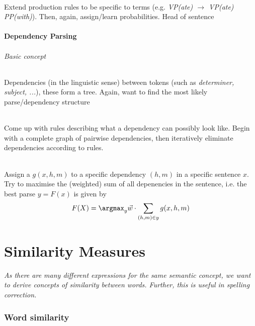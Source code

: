 \documentclass[10pt,twocolumn]{article}
\begin{document}
\paragraph{} Extend production rules to be specific to
terms (e.g. \textit{VP(ate)  $\rightarrow$ VP(ate) PP(with)}). Then, again,
assign/learn probabilities. \todo Head of sentence

\subsection{Dependency Parsing}

\paragraph{\textit{Basic concept}} Dependencies (in the linguistic sense)
between tokens (such as \textit{determiner, subject, ...}), these form a tree.
Again, want to find the most likely parse/dependency structure

\paragraph{ } Come up with rules describing what a
dependency can possibly look like. Begin with a complete graph of pairwise
dependencies, then iteratively eliminate dependencies according to rules.

\paragraph{ } Assign a 
$g(x,h,m)$ to a specific dependency $(h,m)$ in a specific sentence $x$. Try to
maximise the (weighted) sum of all depenencies in the sentence, i.e. the best
parse $y = F(x)$ is given by
\begin{align*}
  F(X) = \argmax_y \vec w \cdot \sum_{(h,m)\in y} g(x,h,m)
\end{align*}


\pagebreak
\part{Similarity Measures}

\textit{As there are many different expressions for the same semantic concept,
  we want to derive concepts of similarity between words. Further, this is
  useful in spelling correction.}

\section{Word similarity}
\end{document}
